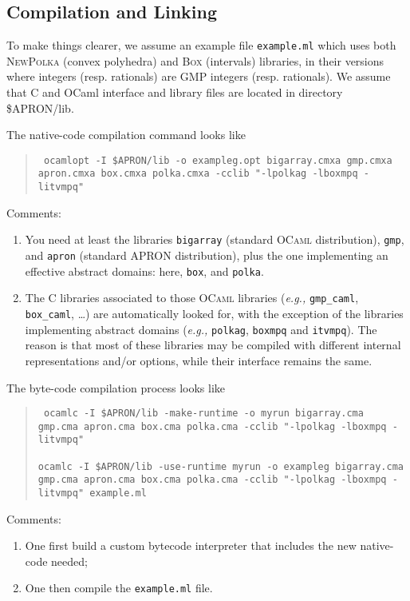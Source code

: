 \documentclass[twoside,10pt,a4paper]{report}
\begin{document}
\subsection*{Compilation and Linking}

To make things clearer, we assume an example file
\texttt{example.ml} which uses both \textsc{NewPolka} (convex
polyhedra) and \textsc{Box} (intervals) libraries, in their
versions where integers (resp. rationals) are GMP integers (resp.
rationals). We assume that C and OCaml interface and library files
are located in directory \$APRON/lib.

The native-code compilation command looks like
\begin{quote}\tt
  ocamlopt -I \$APRON/lib -o exampleg.opt bigarray.cmxa gmp.cmxa apron.cmxa box.cmxa polka.cmxa -cclib "-lpolkag -lboxmpq -litvmpq"
\end{quote}
Comments:
\begin{enumerate}
\item You need at least the libraries \texttt{bigarray} (standard
  \textsc{OCaml} distribution), \texttt{gmp}, and \texttt{apron}
  (standard APRON distribution), plus the one implementing an
  effective abstract domains: here, \texttt{box}, and
  \texttt{polka}.
\item The C libraries associated to those \textsc{OCaml} libraries
  (\textit{e.g.,} \texttt{gmp\_caml}, \texttt{box\_caml}, \ldots)
  are automatically looked for, with the exception of the
  libraries implementing abstract domains (\textit{e.g.,}
  \texttt{polkag}, \texttt{boxmpq} and \texttt{itvmpq}). The reason is that most of
  these libraries may be compiled with different internal
  representations and/or options, while their interface remains
  the same.
\end{enumerate}

The byte-code compilation process looks like
\begin{quote}\tt
  ocamlc -I \$APRON/lib -make-runtime -o myrun bigarray.cma gmp.cma apron.cma box.cma polka.cma -cclib "-lpolkag -lboxmpq -litvmpq" \\
  ~\\
  ocamlc -I \$APRON/lib -use-runtime myrun -o exampleg bigarray.cma gmp.cma apron.cma box.cma polka.cma -cclib "-lpolkag -lboxmpq -litvmpq" example.ml
\end{quote}
Comments:
\begin{enumerate}
\item One first build a custom bytecode interpreter that includes the new native-code needed;
\item One then compile the \texttt{example.ml} file.
\end{enumerate}
\end{document}
